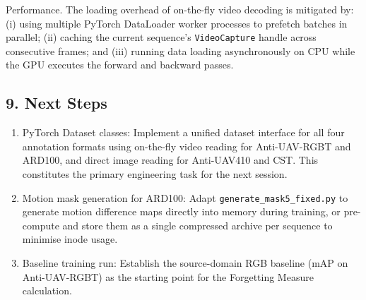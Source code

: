 Performance.
The loading overhead of on-the-fly video decoding is mitigated by:
(i) using multiple PyTorch DataLoader worker processes to prefetch
batches in parallel; (ii) caching the current sequence's
\texttt{VideoCapture} handle across consecutive frames; and (iii)
running data loading asynchronously on CPU while the GPU executes the
forward and backward passes.

\subsection*{9. Next Steps}

\begin{enumerate}
    \item PyTorch Dataset classes: Implement a unified dataset
          interface for all four annotation formats using on-the-fly
          video reading for Anti-UAV-RGBT and ARD100, and direct image
          reading for Anti-UAV410 and CST. This constitutes the primary
          engineering task for the next session.
    \item Motion mask generation for ARD100: Adapt
          \texttt{generate\_mask5\_fixed.py} to generate motion
          difference maps directly into memory during training, or
          pre-compute and store them as a single compressed archive
          per sequence to minimise inode usage.
    \item Baseline training run: Establish the source-domain
          RGB baseline (mAP on Anti-UAV-RGBT) as the starting point
          for the Forgetting Measure calculation.
\end{enumerate}
